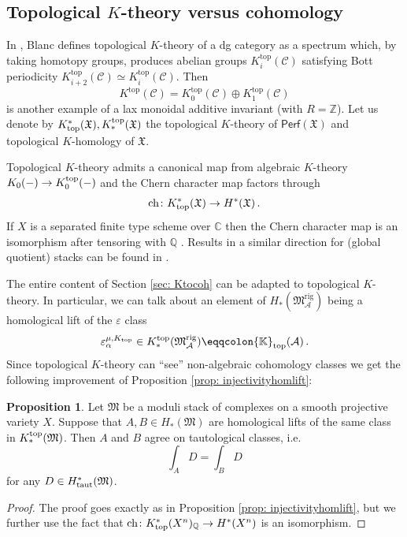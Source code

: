 \documentclass[12pt]{amsart}
\theoremstyle{definition}
\newtheorem{proposition}[definition]{Proposition}
\newcommand{\BC}{{\mathbb{C}}}
\newcommand{\BK}{{\mathbb{K}}}
\newcommand{\BQ}{{\mathbb{Q}}}
\newcommand{\BZ}{{\mathbb{Z}}}
\newcommand{\CA}{{\mathcal A}}
\newcommand{\CC}{{\mathcal C}}
\newcommand{\1}{\mathbf 1}
\newcommand{\FM}{{\mathfrak{M}}}
\newcommand{\FX}{{\mathfrak{X}}}
\newcommand{\ch}{\mathrm{ch}}
\newcommand{\Perf}{\mathsf{Perf}}
\newcommand{\rig}{\mathrm{rig}}
\begin{document}
\subsection{Topological $K$-theory versus cohomology}


In  \cite{B16}, Blanc defines topological $K$-theory of a dg category as a spectrum which, by taking homotopy groups, produces abelian groups $K^{\mathrm{top}}_i(\CC)$ satisfying Bott periodicity $K_{i+2}^{\mathrm{top}}(\CC)\simeq K_i^{\mathrm{top}}(\CC)$. Then
\[K^{\mathrm{top}}(\CC)=K^{\mathrm{top}}_0(\CC)\oplus K^{\mathrm{top}}_1(\CC)\]
is another example of a lax monoidal additive invariant (with $R=\BZ$). Let us denote by $K^\ast_{\textup{top}}(\FX), K_\ast^{\textup{top}}(\FX)$ the topological $K$-theory of $\Perf(\FX)$ and topological $K$-homology of $\FX$. 

Topological $K$-theory admits a canonical map from algebraic $K$-theory $K_0(-)\to K_0^{\textup{top}}(-)$ and the Chern character map factors through
\[\ch\colon K^\ast_{\textup{top}}(\FX)\to H^\ast(\FX)\,.\]
If $X$ is a separated finite type scheme over $\BC$ then the Chern character map is an isomorphism after tensoring with $\BQ$ \cite[Theorem 1.1.b]{B16}. Results in a similar direction for (global quotient) stacks can be found in \cite{HLPomerleano}. 

The entire content of Section \ref{sec: Ktocoh} can be adapted to topological $K$-theory. In particular, we can talk about an element of $H_\ast(\FM^\rig_\CA)$ being a homological lift of the $\varepsilon$ class
\[\varepsilon_{\alpha}^{\mu, K_{\textup{top}}}\in K_\ast^{\textup{top}}(\FM_\CA^\rig)\eqqcolon \BK_{\textup{top}}(\CA)\,.\]
Since topological $K$-theory can ``see'' non-algebraic cohomology classes we get the following improvement of Proposition \ref{prop: injectivityhomlift}:


\begin{proposition}\label{prop: injectivityhomlifttop}
    Let $\FM$ be a moduli stack of complexes on a smooth projective variety $X$. Suppose that $A, B\in H_\ast(\FM)$ are homological lifts of the same class in $K_\ast^{\textup{top}}(\FM)$. Then $A$ and $B$ agree on tautological classes, i.e. 
    \[\int_A D=\int_B D\]
    for any $D\in H^\ast_{\textup{taut}}(\FM)$.
\end{proposition}
\begin{proof}
   The proof goes exactly as in Proposition \ref{prop: injectivityhomlift}, but we further use the fact that $\ch\colon K^\ast_{\textup{top}}(X^n)_\BQ\to H^\ast(X^n)$ is an isomorphism.
\end{proof}
\end{document}
